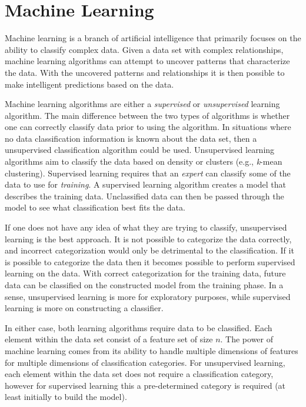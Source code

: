 \section{Machine Learning}
\label{sec:background_machine_learning}
Machine learning is a branch of artificial intelligence that primarily focuses on the ability to classify complex data. Given a data set with complex relationships, machine learning algorithms can attempt to uncover patterns that characterize the data. With the uncovered patterns and relationships it is then possible to make intelligent predictions based on the data.

Machine learning algorithms are either a \emph{supervised} or \emph{unsupervised} learning algorithm. The main difference between the two types of algorithms is whether one can correctly classify data prior to using the algorithm. In situations where no data classification information is known about the data set, then a unsupervised classification algorithm could be used. Unsupervised learning algorithms aim to classify the data based on density or clusters (e.g., \emph{k}-mean clustering). Supervised learning requires that an \emph{expert} can classify some of the data to use for \emph{training}. A supervised learning algorithm creates a model that describes the training data. Unclassified data can then be passed through the model to see what classification best fits the data.

If one does not have any idea of what they are trying to classify, unsupervised learning is the best approach. It is not possible to categorize the data correctly, and incorrect categorization would only be detrimental to the classification. If it is possible to categorize the data then it becomes possible to perform supervised learning on the data. With correct categorization for the training data, future data can be classified on the constructed model from the training phase. In a sense, unsupervised learning is more for exploratory purposes, while supervised learning is more on constructing a classifier.

In either case, both learning algorithms require data to be classified. Each element within the data set consist of a feature set of size $n$. The power of machine learning comes from its ability to handle multiple dimensions of features for multiple dimensions of classification categories. For unsupervised learning, each element within the data set does not require a classification category, however for supervised learning this a pre-determined category is required (at least initially to build the model).

